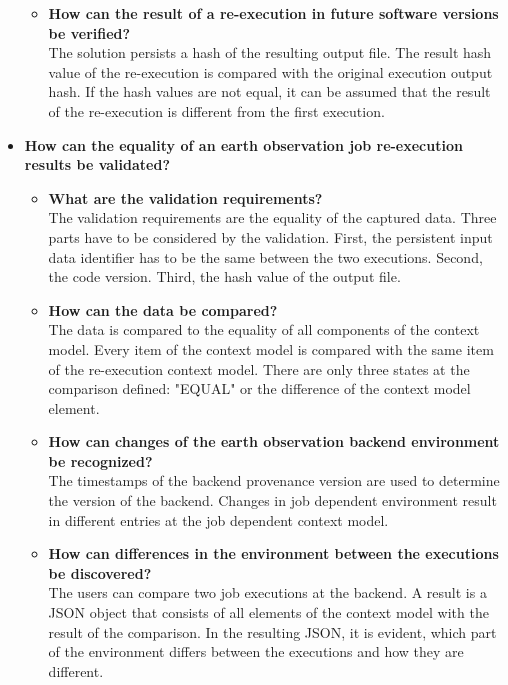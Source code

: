 \documentclass[draft,final]{vutinfth} %
\begin{document}
\begin{itemize}
\begin{itemize}
		\item \textbf{How can the result of a re-execution in future software versions be verified?} \\
		The solution persists a hash of the resulting output file. The result hash value of the re-execution is compared with the original execution output hash. If the hash values are not equal, it can be assumed that the result of the re-execution is different from the first execution.  
	\end{itemize}
	\item \textbf{How can the equality of an earth observation job re-execution results be validated?}
	\begin{itemize}
		\item \textbf{What are the validation requirements?} \\
		The validation requirements are the equality of the captured data. Three parts have to be considered by the validation. First, the persistent input data identifier has to be the same between the two executions. Second, the code version. Third, the hash value of the output file.
		\item \textbf{How can the data be compared?} \\
		The data is compared to the equality of all components of the context model. Every item of the context model is compared with the same item of the re-execution context model. There are only three states at the comparison defined: "EQUAL" or the difference of the context model element.
		\item \textbf{How can changes of the earth observation backend environment be recognized?} \\
		The timestamps of the backend provenance version are used to determine the version of the backend. Changes in job dependent environment result in different entries at the job dependent context model.   
		\item \textbf{How can differences in the environment between the executions be discovered?} \\
		The users can compare two job executions at the backend. A result is a JSON object that consists of all elements of the context model with the result of the comparison. In the resulting JSON, it is evident, which part of the environment differs between the executions and how they are different.
	\end{itemize}
\end{itemize}
\end{document}
